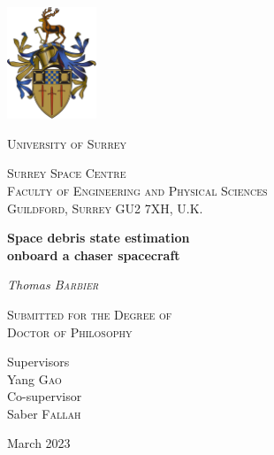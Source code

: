 \begin{titlepage}
	\centering
	\includegraphics[width=0.2\textwidth]{Figures/US}
	\par\vspace{1cm}
	
	{\scshape\huge University of Surrey}
		\vspace{1cm}	

	{\scshape\LARGE Surrey Space Centre}\\
	{\scshape Faculty of Engineering and Physical Sciences\\Guildford, Surrey GU2 7XH, U.K.}
       \vspace{1cm}		
	
	{\huge\bfseries Space debris state estimation \\onboard a chaser spacecraft  \par}
	\vspace{1.0cm}
	
	{\Large\itshape Thomas \textsc{Barbier} \par}
	\vspace{1.0cm}
	
	{\scshape\large Submitted for the Degree of \\
		Doctor of Philosophy}
	\vspace{1.0cm}

	Supervisors \\
	Yang \textsc{Gao}\\ 

    \vspace{0.5cm}
    Co-supervisor \\
	Saber \textsc{Fallah}\\ 
	
	\vspace{2cm} %
	
	\large March 2023\par

\end{titlepage}
